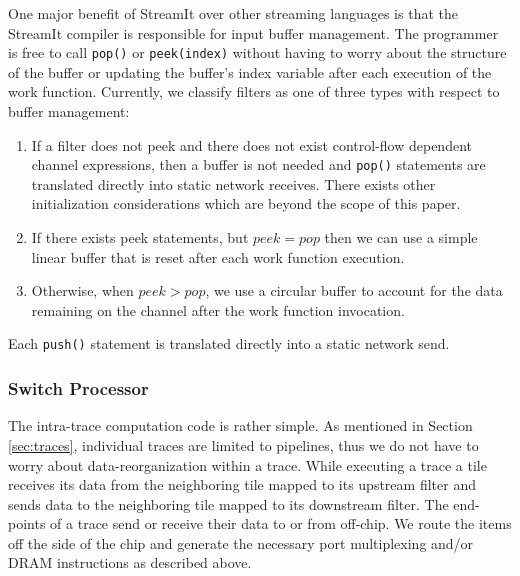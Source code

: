 One major benefit of StreamIt over other streaming languages is that
the StreamIt compiler is responsible for input buffer management.  The
programmer is free to call {\tt pop()} or {\tt peek(index)} without
having to worry about the structure of the buffer or updating the
buffer's index variable after each execution of the work function.
Currently, we classify filters as one of three types with respect to
buffer management: 
\begin{enumerate}
\item If a filter does not peek and there does not exist
control-flow dependent channel expressions, then a buffer is not needed
and {\tt pop()} statements are translated directly into static network
receives.  There exists other initialization considerations which are
beyond the scope of this paper.
\item If there exists peek statements, but $peek = pop$ then we can
use a simple linear buffer that is reset after each work function execution.
\item Otherwise, when $peek > pop$, we use a circular buffer to
account for the data remaining on the channel after the work function
invocation.
\end{enumerate}
Each {\tt push()} statement is translated directly into a static
network send.  

\subsubsection{Switch Processor}
The intra-trace computation code is rather simple.  As mentioned in
Section \ref{sec:traces}, individual traces are limited to pipelines,
thus we do not have to worry about data-reorganization within a trace.
While executing a trace a tile receives its data from the
neighboring tile mapped to its upstream filter and sends data to the
neighboring tile mapped to its downstream filter.  The end-points of a
trace send or receive their data to or from off-chip.  We route the
items off the side of the chip and generate the necessary port
multiplexing and/or DRAM instructions as described above.

